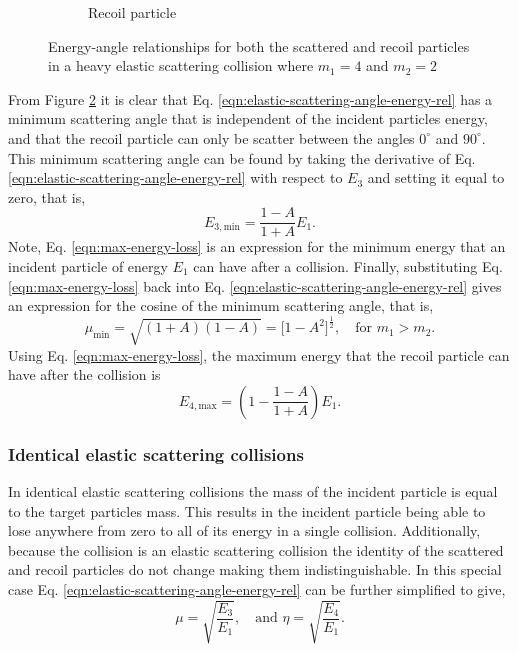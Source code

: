 \begin{figure}[!htb]
\begin{subfigure}{.5\textwidth}
    \caption{Recoil particle}
    \label{fig:heavy-elastic-energy-angle-recoil}
  \end{subfigure}
  \caption{Energy-angle relationships for both the scattered and recoil particles in a heavy elastic scattering collision where $m_1 = 4$ and $m_2 = 2$}
  \label{fig:heavy-elastic-energy-angle}
\end{figure}

From Figure \ref{fig:heavy-elastic-energy-angle} it is clear that Eq. \eqref{eqn:elastic-scattering-angle-energy-rel} has a minimum scattering angle that is independent of the incident particles energy, and that the recoil particle can only be scatter between the angles $0^{\circ}$ and $90^{\circ}$. This minimum scattering angle can be found by taking the derivative of Eq. \eqref{eqn:elastic-scattering-angle-energy-rel} with respect to $E_{3}$ and setting it equal to zero, that is,
\begin{equation} \label{eqn:max-energy-loss}
  E_{3,\text{min}} = \dfrac{1-A}{1+A} E_{1}.
\end{equation}
Note, Eq. \eqref{eqn:max-energy-loss} is an expression for the minimum energy that an incident particle of energy $E_1$ can have after a collision. Finally, substituting Eq. \eqref{eqn:max-energy-loss} back into Eq. \eqref{eqn:elastic-scattering-angle-energy-rel} gives an expression for the cosine of the minimum scattering angle, that is,
\begin{equation}
  \mu_{\text{min}} = \sqrt{(1+A)(1-A)} = \Big[1 - A^2\Big]^{\frac{1}{2}}, \quad \text{for} \,\, m_{1} > m_{2}.
\end{equation}
Using Eq. \eqref{eqn:max-energy-loss}, the maximum energy that the recoil particle can have after the collision is
\begin{equation}
  E_{4,\text{max}} = \left(1 - \dfrac{1-A}{1+A}\right) E_{1}.
\end{equation}

\subsubsection{Identical elastic scattering collisions}
In identical elastic scattering collisions the mass of the incident particle is equal to the target particles mass. This results in the incident particle being able to lose anywhere from zero to all of its energy in a single collision. Additionally, because the collision is an elastic scattering collision the identity of the scattered and recoil particles do not change making them indistinguishable. In this special case Eq. \eqref{eqn:elastic-scattering-angle-energy-rel} can be further simplified to give,
\begin{equation} \label{eqn:identical-particle-elastic-scattering}
  \mu = \sqrt{\dfrac{E_3}{E_1}}, \quad \text{and} \,\, \eta = \sqrt{\dfrac{E_4}{E_1}}.
\end{equation}

